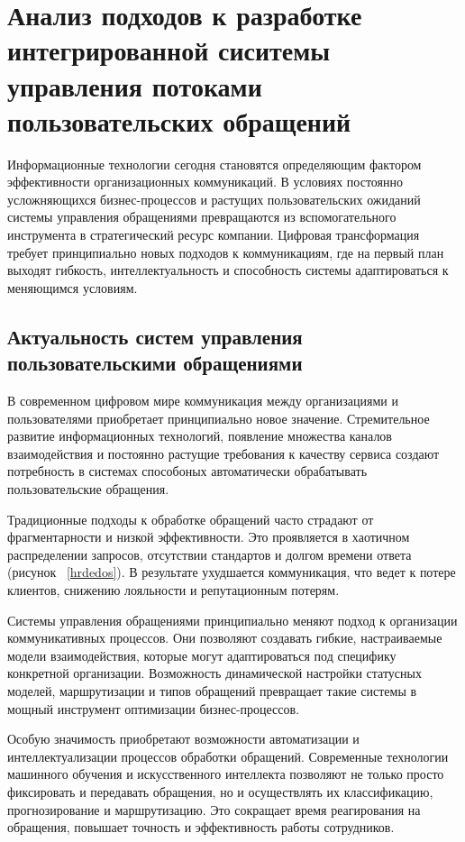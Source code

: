 \section{Анализ подходов к разработке интегрированной сиситемы управления потоками пользовательских обращений}
\label{sec:analysis}

Информационные технологии сегодня становятся определяющим фактором эффективности организационных коммуникаций. В условиях постоянно усложняющихся бизнес-процессов и растущих пользовательских ожиданий системы управления обращениями превращаются из вспомогательного инструмента в стратегический ресурс компании. Цифровая трансформация требует принципиально новых подходов к коммуникациям, где на первый план выходят гибкость, интеллектуальность и способность системы адаптироваться к меняющимся условиям.

\subsection{Актуальность систем управления пользовательскими обращениями}

В современном цифровом мире коммуникация между организациями и пользователями приобретает принципиально новое значение. Стремительное развитие информационных технологий, появление множества каналов взаимодействия и постоянно растущие требования к качеству сервиса создают потребность в системах способоных автоматически обрабатывать пользовательские обращения.

Традиционные подходы к обработке обращений часто страдают от фрагментарности и низкой эффективности. Это проявляется в хаотичном распределении запросов, отсутствии стандартов и долгом времени ответа (рисунок ~\ref{hrdedos}). В результате ухудшается коммуникация, что ведет к потере клиентов, снижению лояльности и репутационным потерям.


Системы управления обращениями принципиально меняют подход к организации коммуникативных процессов. Они позволяют создавать гибкие, настраиваемые модели взаимодействия, которые могут адаптироваться под специфику конкретной организации. Возможность динамической настройки статусных моделей, маршрутизации и типов обращений превращает такие системы в мощный инструмент оптимизации бизнес-процессов.

Особую значимость приобретают возможности автоматизации и интеллектуализации процессов обработки обращений. Современные технологии машинного обучения и искусственного интеллекта позволяют не только просто фиксировать и передавать обращения, но и осуществлять их  классификацию, прогнозирование и маршрутизацию. Это сокращает время реагирования на обращения, повышает точность и эффективность работы сотрудников.

